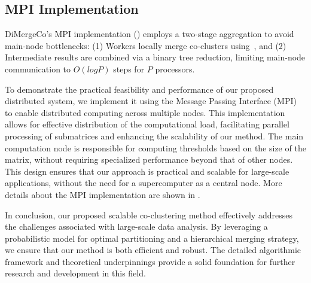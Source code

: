 \documentclass[journal]{IEEEtran}
\begin{document}
\subsection{MPI Implementation}
\label{subsec:mpi_implementation}
DiMergeCo's MPI implementation () employs a two-stage aggregation to avoid main-node bottlenecks: (1) Workers locally merge co-clusters using~, and (2) Intermediate results are combined via a binary tree reduction, limiting main-node communication to $O(log P)$ steps for $P$ processors.

To demonstrate the practical feasibility and performance of our proposed distributed system, we implement it using the Message Passing Interface (MPI) to enable distributed computing across multiple nodes. This implementation allows for effective distribution of the computational load, facilitating parallel processing of submatrices and enhancing the scalability of our method. The main computation node is responsible for computing thresholds based on the size of the matrix, without requiring specialized performance beyond that of other nodes. This design ensures that our approach is practical and scalable for large-scale applications, without the need for a supercomputer as a central node.
More details about the MPI implementation are shown in .

In conclusion, our proposed scalable co-clustering method effectively addresses the challenges associated with large-scale data analysis. By leveraging a probabilistic model for optimal partitioning and a hierarchical merging strategy, we ensure that our method is both efficient and robust. The detailed algorithmic framework and theoretical underpinnings provide a solid foundation for further research and development in this field.
\end{document}
